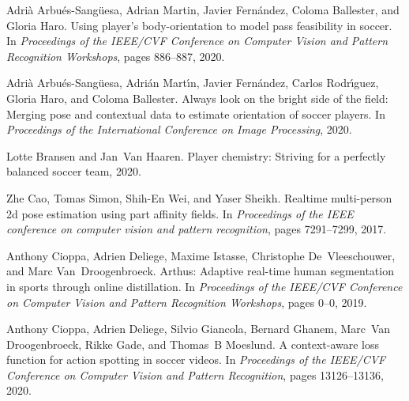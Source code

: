 \documentclass{article}
\begin{document}
%
%

\begin{thebibliography}{}

Adri{\`a} Arbu{\'e}s-Sang{\"u}esa, Adrian Martin, Javier Fern{\'a}ndez, Coloma
  Ballester, and Gloria Haro.
\newblock Using player's body-orientation to model pass feasibility in soccer.
\newblock In {\em Proceedings of the IEEE/CVF Conference on Computer Vision and
  Pattern Recognition Workshops}, pages 886--887, 2020.

Adri{\`a} Arbu{\'e}s-Sang{\"u}esa, Adri{\'a}n Mart{\'\i}n, Javier
  Fern{\'a}ndez, Carlos Rodr{\'\i}guez, Gloria Haro, and Coloma Ballester.
\newblock Always look on the bright side of the field: Merging pose and
  contextual data to estimate orientation of soccer players.
\newblock In {\em Proceedings of the International Conference on Image
  Processing}, 2020.

Lotte Bransen and Jan~Van Haaren.
\newblock Player chemistry: Striving for a perfectly balanced soccer team,
  2020.

Zhe Cao, Tomas Simon, Shih-En Wei, and Yaser Sheikh.
\newblock Realtime multi-person 2d pose estimation using part affinity fields.
\newblock In {\em Proceedings of the IEEE conference on computer vision and
  pattern recognition}, pages 7291--7299, 2017.

Anthony Cioppa, Adrien Deliege, Maxime Istasse, Christophe De~Vleeschouwer, and
  Marc Van~Droogenbroeck.
\newblock Arthus: Adaptive real-time human segmentation in sports through
  online distillation.
\newblock In {\em Proceedings of the IEEE/CVF Conference on Computer Vision and
  Pattern Recognition Workshops}, pages 0--0, 2019.

Anthony Cioppa, Adrien Deliege, Silvio Giancola, Bernard Ghanem, Marc~Van
  Droogenbroeck, Rikke Gade, and Thomas~B Moeslund.
\newblock A context-aware loss function for action spotting in soccer videos.
\newblock In {\em Proceedings of the IEEE/CVF Conference on Computer Vision and
  Pattern Recognition}, pages 13126--13136, 2020.


\end{thebibliography}
\end{document}
